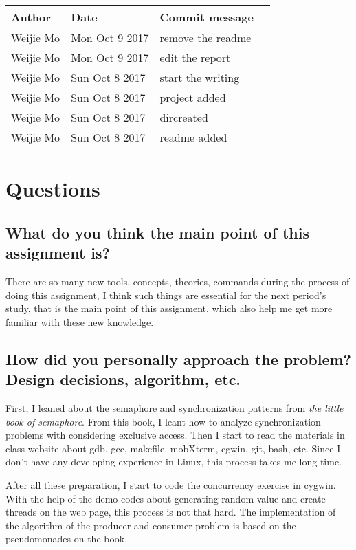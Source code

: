 \documentclass[10pt,draftclsnofoot,peerreview,letterpaper,onecolumn,]{IEEEtran}
\begin{document}
\begin{table}[h]
\centering
\begin{tabular}{|l|l|l|l|}
\hline

Author    & Date & Commit message
\\ \hline
Weijie Mo & Mon Oct 9 2017 & remove the readme
\\ \hline
Weijie Mo & Mon Oct 9 2017 & edit the report
\\ \hline
Weijie Mo & Sun Oct 8 2017 & start the writing
\\ \hline
Weijie Mo & Sun Oct 8 2017 & project added
\\ \hline
Weijie Mo & Sun Oct 8 2017 & dircreated
\\ \hline
Weijie Mo & Sun Oct 8 2017 & readme added
\\ \hline

\end{tabular}
\end{table}

\section{Questions}
\subsection{What do you think the main point of this assignment is?}
There are so many new tools, concepts, theories, commands during the process of doing this assignment, I think such things are essential for the next period’s study, that is the main point of this assignment, which also help me get more familiar with these new knowledge.

\subsection{How did you personally approach the problem? Design decisions, algorithm, etc.}
First, I leaned about the semaphore and synchronization patterns from \emph{the little book of semaphore}. From this book, I leant how to analyze synchronization problems with considering exclusive access. Then I start to read the materials in class website about gdb, gcc, makefile, mobXterm, cgwin, git, bash, etc. Since I don't have any developing experience in Linux, this process takes me long time.

After all these preparation, I start to code the concurrency exercise in cygwin. With the help of the demo codes about generating random value and create threads on the web page, this process is not that hard. The implementation of the algorithm of the producer and consumer problem is based on the pseudomonades on the book.
\end{document}
